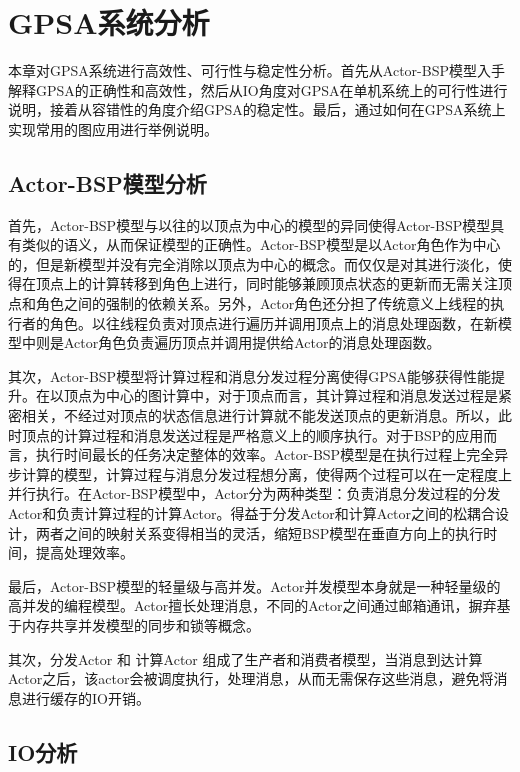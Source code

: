 
\chapter{GPSA系统分析}
本章对GPSA系统进行高效性、可行性与稳定性分析。首先从Actor-BSP模型入手解释GPSA的正确性和高效性，然后从IO角度对GPSA在单机系统上的可行性进行说明，接着从容错性的角度介绍GPSA的稳定性。最后，通过如何在GPSA系统上实现常用的图应用进行举例说明。

\section{Actor-BSP模型分析}
首先，Actor-BSP模型与以往的以顶点为中心的模型的异同使得Actor-BSP模型具有类似的语义，从而保证模型的正确性。Actor-BSP模型是以Actor角色作为中心的，但是新模型并没有完全消除以顶点为中心的概念。而仅仅是对其进行淡化，使得在顶点上的计算转移到角色上进行，同时能够兼顾顶点状态的更新而无需关注顶点和角色之间的强制的依赖关系。另外，Actor角色还分担了传统意义上线程的执行者的角色。以往线程负责对顶点进行遍历并调用顶点上的消息处理函数，在新模型中则是Actor角色负责遍历顶点并调用提供给Actor的消息处理函数。

其次，Actor-BSP模型将计算过程和消息分发过程分离使得GPSA能够获得性能提升。在以顶点为中心的图计算中，对于顶点而言，其计算过程和消息发送过程是紧密相关，不经过对顶点的状态信息进行计算就不能发送顶点的更新消息。所以，此时顶点的计算过程和消息发送过程是严格意义上的顺序执行。对于BSP的应用而言，执行时间最长的任务决定整体的效率。Actor-BSP模型是在执行过程上完全异步计算的模型，计算过程与消息分发过程想分离，使得两个过程可以在一定程度上并行执行。在Actor-BSP模型中，Actor分为两种类型：负责消息分发过程的分发Actor和负责计算过程的计算Actor。得益于分发Actor和计算Actor之间的松耦合设计，两者之间的映射关系变得相当的灵活，缩短BSP模型在垂直方向上的执行时间，提高处理效率。

最后，Actor-BSP模型的轻量级与高并发。Actor并发模型本身就是一种轻量级的高并发的编程模型。Actor擅长处理消息，不同的Actor之间通过邮箱通讯，摒弃基于内存共享并发模型的同步和锁等概念。



其次，分发Actor 和 计算Actor 组成了生产者和消费者模型，当消息到达计算Actor之后，该actor会被调度执行，处理消息，从而无需保存这些消息，避免将消息进行缓存的IO开销。

\section{IO分析}

